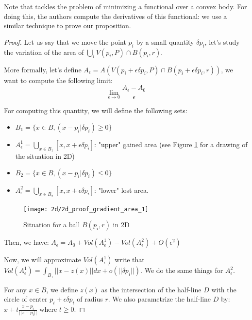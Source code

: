 Note that \cite{lachand2005minimizing} tackles the problem of minimizing a
functional over a convex body. For doing this, the authors compute the
derivatives of this functional: we use a similar technique to prove our
proposition.

\begin{proof}

Let us say that we move the point $ p _i $ by a small quantity $ \delta p_i $,
let's study the variation of the area of $ \bigcup_i V(p_i, P) \cap B(p_i, r) $.

More formally, let's define $ A_{\epsilon} = A(V(p_i + \epsilon \delta p_i, P) \cap
B(p_i + \epsilon \delta p_i, r)) $, we want to compute the following limit:
$$ \lim\limits_{\epsilon \to 0} \frac{A_{\epsilon} - A_0}{\epsilon} $$

For computing this quantity, we will define the following sets:
\begin{itemize}
    \item $ B_1 = \{ x \in B, (x - p_i | \delta p_i) \geq 0\} $
    \item $ A^1_{\epsilon} = \bigcup_{x \in B_1} [x, x + \epsilon \delta p_i] $:
        "upper" gained area (see Figure \ref{fig:demo-gradient} for a drawing of the
        situation in 2D)
    \item $ B_2 = \{ x \in B, (x - p_i | \delta p_i) \leq 0\} $
    \item $ A^2_{\epsilon} = \bigcup_{x \in B_2} [x, x + \epsilon \delta p_i] $:
        "lower" lost area.
\end{itemize}

\begin{figure}[h]
    \centering
    \texttt{[image: 2d/2d\_proof\_gradient\_area\_1]}
    \caption{Situation for a ball $ B(p_i, r) $ in 2D}
    \label{fig:demo-gradient}
\end{figure}

Then, we have: $ A_\epsilon = A_0 + Vol(A^1_\epsilon) - Vol(A^2_\epsilon) +
O(\epsilon^2) $

Now, we will approximate $ Vol(A^1_\epsilon) $ write that $ Vol(A^1_\epsilon) =
\int_{B_1} || x - z(x) || dx + o(||\delta p_i||) $. We do the same things for $
A^2_\epsilon $.

For any $ x \in B $, we define $ z(x) $ as the intersection of the half-line $ D
$ with the circle of center $ p_i + \epsilon \delta p_i $ of radius $ r $. We
also parametrize the half-line $ D $ by: $ x + t \frac{x - p_i}{||x - p_i||} $
where $ t \ge 0 $.


\end{proof}
